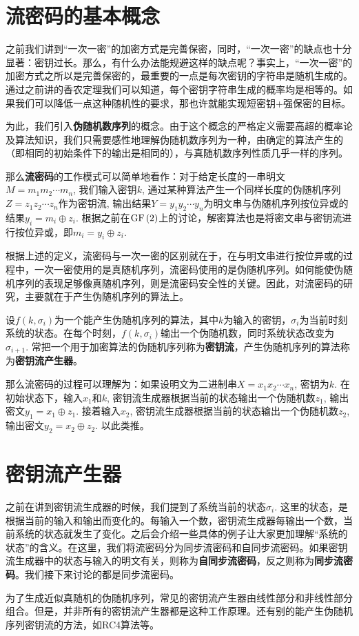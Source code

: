 \section{流密码的基本概念}
之前我们讲到“一次一密”的加密方式是完善保密，同时，“一次一密”的缺点也十分显著：密钥过长。那么，有什么办法能规避这样的缺点呢？事实上，“一次一密”的加密方式之所以是完善保密的，最重要的一点是每次密钥的字符串是随机生成的。通过之前讲的香农定理我们可以知道，每个密钥字符串生成的概率均是相等的。如果我们可以降低一点这种随机性的要求，那也许就能实现短密钥+强保密的目标。\par
为此，我们引入\textbf{伪随机数序列}的概念。由于这个概念的严格定义需要高超的概率论及算法知识，我们只需要感性地理解伪随机数序列为一种，由确定的算法产生的（即相同的初始条件下的输出是相同的），与真随机数序列性质几乎一样的序列。\par
那么\textbf{流密码}的工作模式可以简单地看作：对于给定长度的一串明文$M=m_1m_2\cdots m_n$, 我们输入密钥$k$, 通过某种算法产生一个同样长度的伪随机序列$Z=z_1z_2\cdots z_n$作为密钥流, 输出结果$Y=y_1y_2\cdots y_n$为明文串与伪随机序列按位异或的结果$y_i=m_i\oplus z_i$. 根据之前在$\mathrm{GF}\left( {2}\right)$上的讨论，解密算法也是将密文串与密钥流进行按位异或，即$m_i=y_i\oplus z_i$.\par
根据上述的定义，流密码与一次一密的区别就在于，在与明文串进行按位异或的过程中，一次一密使用的是真随机序列，流密码使用的是伪随机序列。如何能使伪随机序列的表现足够像真随机序列，则是流密码安全性的关键。因此，对流密码的研究，主要就在于产生伪随机序列的算法上。\par
设$f(k, \sigma_i)$为一个能产生伪随机序列的算法，其中$k$为输入的密钥，$\sigma_i$为当前时刻系统的状态。在每个时刻，$f(k, \sigma_i)$输出一个伪随机数，同时系统状态改变为$\sigma_{i+1}$. 常把一个用于加密算法的伪随机序列称为\textbf{密钥流}，产生伪随机序列的算法称为\textbf{密钥流产生器}。\par
那么流密码的过程可以理解为：如果设明文为二进制串$X=x_1x_2\cdots x_n$, 密钥为$k$. 在初始状态下，输入$x_1$和$k$, 密钥流生成器根据当前的状态输出一个伪随机数$z_1$, 输出密文$y_1=x_1\oplus z_1$. 接着输入$x_2$, 密钥流生成器根据当前的状态输出一个伪随机数$z_2$, 输出密文$y_2=x_2\oplus z_2$. 以此类推。
\section{密钥流产生器}
之前在讲到密钥流生成器的时候，我们提到了系统当前的状态$\sigma_i$. 这里的状态，是根据当前的输入和输出而变化的。每输入一个数，密钥流生成器每输出一个数，当前系统的状态就发生了变化。之后会介绍一些具体的例子让大家更加理解“系统的状态”的含义。在这里，我们将流密码分为同步流密码和自同步流密码。如果密钥流生成器中的状态与输入的明文有关，则称为\textbf{自同步流密码}，反之则称为\textbf{同步流密码}。我们接下来讨论的都是同步流密码。\par
为了生成近似真随机的伪随机序列，常见的密钥流产生器由线性部分和非线性部分组合。但是，并非所有的密钥流产生器都是这种工作原理。还有别的能产生伪随机序列密钥流的方法，如RC4算法等。
